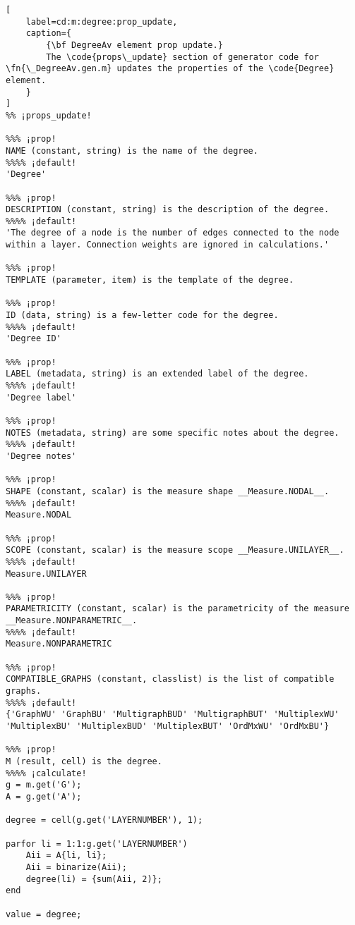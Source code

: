 \documentclass{tufte-handout}
\begin{document}
\begin{lstlisting}[
	label=cd:m:degree:prop_update,
	caption={
		{\bf DegreeAv element prop update.}
		The \code{props\_update} section of generator code for \fn{\_DegreeAv.gen.m} updates the properties of the \code{Degree} element.
	}
]
%% ¡props_update!

%%% ¡prop!
NAME (constant, string) is the name of the degree.
%%%% ¡default!
'Degree'

%%% ¡prop!
DESCRIPTION (constant, string) is the description of the degree.
%%%% ¡default!
'The degree of a node is the number of edges connected to the node within a layer. Connection weights are ignored in calculations.'

%%% ¡prop!
TEMPLATE (parameter, item) is the template of the degree.

%%% ¡prop!
ID (data, string) is a few-letter code for the degree.
%%%% ¡default!
'Degree ID'

%%% ¡prop!
LABEL (metadata, string) is an extended label of the degree.
%%%% ¡default!
'Degree label'

%%% ¡prop!
NOTES (metadata, string) are some specific notes about the degree.
%%%% ¡default!
'Degree notes'

%%% ¡prop!
SHAPE (constant, scalar) is the measure shape __Measure.NODAL__.
%%%% ¡default!
Measure.NODAL

%%% ¡prop!
SCOPE (constant, scalar) is the measure scope __Measure.UNILAYER__.
%%%% ¡default!
Measure.UNILAYER

%%% ¡prop!
PARAMETRICITY (constant, scalar) is the parametricity of the measure __Measure.NONPARAMETRIC__.
%%%% ¡default!
Measure.NONPARAMETRIC

%%% ¡prop!
COMPATIBLE_GRAPHS (constant, classlist) is the list of compatible graphs.
%%%% ¡default!
{'GraphWU' 'GraphBU' 'MultigraphBUD' 'MultigraphBUT' 'MultiplexWU' 'MultiplexBU' 'MultiplexBUD' 'MultiplexBUT' 'OrdMxWU' 'OrdMxBU'}

%%% ¡prop!
M (result, cell) is the degree.
%%%% ¡calculate!
g = m.get('G'); 
A = g.get('A');

degree = cell(g.get('LAYERNUMBER'), 1);

parfor li = 1:1:g.get('LAYERNUMBER')
    Aii = A{li, li};
    Aii = binarize(Aii);
    degree(li) = {sum(Aii, 2)};
end

value = degree;
\end{lstlisting}
\end{document}
